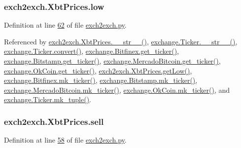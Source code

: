 \subsubsection[{\texorpdfstring{low}{low}}]{\setlength{\rightskip}{0pt plus 5cm}exch2exch.\+Xbt\+Prices.\+low}\hypertarget{classexch2exch_1_1_xbt_prices_a8cef13f833a894d4fc5b8296bb4906fa}{}\label{classexch2exch_1_1_xbt_prices_a8cef13f833a894d4fc5b8296bb4906fa}


Definition at line \hyperlink{exch2exch_8py_source_l00062}{62} of file \hyperlink{exch2exch_8py_source}{exch2exch.\+py}.



Referenced by \hyperlink{exch2exch_8py_source_l00091}{exch2exch.\+Xbt\+Prices.\+\_\+\+\_\+str\+\_\+\+\_\+()}, \hyperlink{exchange_8py_source_l00111}{exchange.\+Ticker.\+\_\+\+\_\+str\+\_\+\+\_\+()}, \hyperlink{exchange_8py_source_l00065}{exchange.\+Ticker.\+convert()}, \hyperlink{exchange_8py_source_l00332}{exchange.\+Bitfinex.\+get\+\_\+ticker()}, \hyperlink{exchange_8py_source_l00401}{exchange.\+Bitstamp.\+get\+\_\+ticker()}, \hyperlink{exchange_8py_source_l00535}{exchange.\+Mercado\+Bitcoin.\+get\+\_\+ticker()}, \hyperlink{exchange_8py_source_l00600}{exchange.\+Ok\+Coin.\+get\+\_\+ticker()}, \hyperlink{exch2exch_8py_source_l00079}{exch2exch.\+Xbt\+Prices.\+get\+Low()}, \hyperlink{exchange_8py_source_l00346}{exchange.\+Bitfinex.\+mk\+\_\+ticker()}, \hyperlink{exchange_8py_source_l00415}{exchange.\+Bitstamp.\+mk\+\_\+ticker()}, \hyperlink{exchange_8py_source_l00549}{exchange.\+Mercado\+Bitcoin.\+mk\+\_\+ticker()}, \hyperlink{exchange_8py_source_l00614}{exchange.\+Ok\+Coin.\+mk\+\_\+ticker()}, and \hyperlink{exchange_8py_source_l00096}{exchange.\+Ticker.\+mk\+\_\+tuple()}.

\subsubsection[{\texorpdfstring{sell}{sell}}]{\setlength{\rightskip}{0pt plus 5cm}exch2exch.\+Xbt\+Prices.\+sell}\hypertarget{classexch2exch_1_1_xbt_prices_a06fd0cfb03d485af3364a0d86fbe5385}{}\label{classexch2exch_1_1_xbt_prices_a06fd0cfb03d485af3364a0d86fbe5385}


Definition at line \hyperlink{exch2exch_8py_source_l00058}{58} of file \hyperlink{exch2exch_8py_source}{exch2exch.\+py}.



